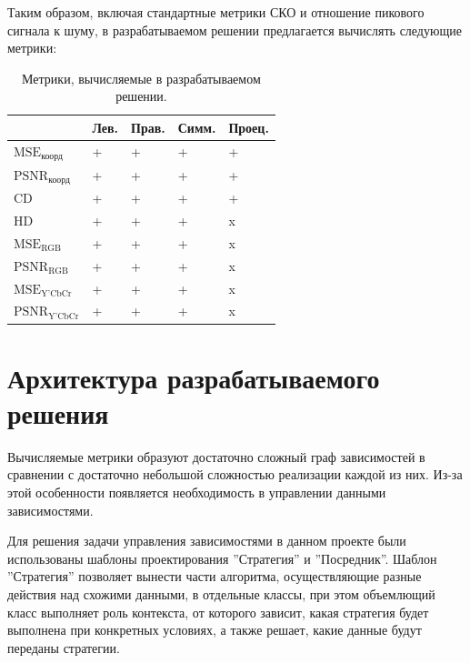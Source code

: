 Таким образом, включая стандартные метрики СКО и отношение пикового сигнала к
шуму, в разрабатываемом решении предлагается вычислять следующие метрики:

\begin{xltabular}{\linewidth}{|l|X|X|X|X|}
    \caption{
        Метрики, вычисляемые в разрабатываемом решении.
        \label{tab:calculated_metrics}
    } \\
    \hline
    & Лев. & Прав. & Симм. & Проец. \\
    \hline
    $\text{MSE}_{\text{коорд}}$ & + & + & + & + \\
    \hline
    $\text{PSNR}_{\text{коорд}}$ & + & + & + & + \\
    \hline
    $\text{CD}$ & + & + & + & + \\
    \hline
    $\text{HD}$ & + & + & + & x \\
    \hline
    $\text{MSE}_{\text{RGB}}$ & + & + & + & x \\
    \hline
    $\text{PSNR}_{\text{RGB}}$ & + & + & + & x \\
    \hline
    $\text{MSE}_{\text{Y'CbCr}}$ & + & + & + & x \\
    \hline
    $\text{PSNR}_{\text{Y'CbCr}}$ & + & + & + & x \\
    \hline
\end{xltabular}

\section{Архитектура разрабатываемого решения}


Вычисляемые метрики образуют достаточно сложный граф зависимостей в сравнении с
достаточно небольшой сложностью реализации каждой из них. Из-за этой особенности
появляется необходимость в управлении данными зависимостями.


Для решения задачи управления зависимостями в данном проекте были использованы
шаблоны проектирования ''Стратегия'' и ''Посредник''. Шаблон ''Стратегия''
позволяет вынести части алгоритма, осуществляющие разные действия над схожими
данными, в отдельные классы, при этом объемлющий класс выполняет роль контекста,
от которого зависит, какая стратегия будет выполнена при конкретных условиях, а
также решает, какие данные будут переданы стратегии.

